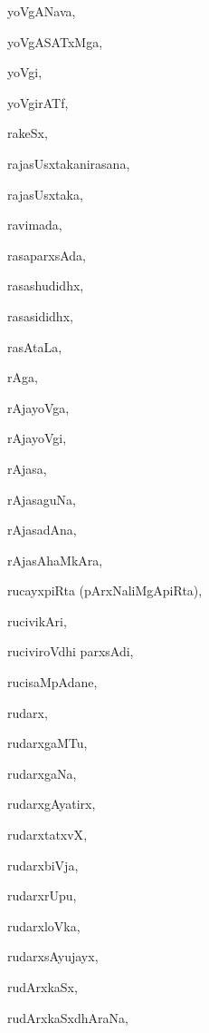 \begin{multicols}{2}
{yoVgANava}, \pageref{yoVgANava}

{yoVgASATxMga}, \pageref{yoVgASATxMga}

{yoVgi}, \pageref{yoVgi}

{yoVgirATf}, \pageref{yoVgirATf}

{rakeSx}, \pageref{rakeSx}

{rajasUsxtakanirasana}, \pageref{rajasUsxtakanirasana}

{rajasUsxtaka}, \pageref{rajasUsxtaka}

{ravimada}, \pageref{ravimada}

{rasaparxsAda}, \pageref{rasaparxsAda}

{rasashudidhx}, \pageref{rasashudidhx}

{rasasididhx}, \pageref{rasasididhx}

{rasAtaLa}, \pageref{rasAtaLa}

{rAga}, \pageref{rAga}

{rAjayoVga}, \pageref{rAjayoVga}

{rAjayoVgi}, \pageref{rAjayoVgi}

{rAjasa}, \pageref{rAjasa}

{rAjasaguNa}, \pageref{rAjasaguNa}

{rAjasadAna}, \pageref{rAjasadAna}

{rAjasAhaMkAra}, \pageref{rAjasAhaMkAra}

{rucayxpiRta (pArxNaliMgApiRta)}, \pageref{rucayxpiRta (pArxNaliMgApiRta)}

{rucivikAri}, \pageref{rucivikAri}

{ruciviroVdhi parxsAdi}, \pageref{ruciviroVdhiparxsAdi}

{rucisaMpAdane}, \pageref{rucisaMpAdane}

{rudarx}, \pageref{rudarx}

{rudarxgaMTu}, \pageref{rudarxgaMTu}

{rudarxgaNa}, \pageref{rudarxgaNa}

{rudarxgAyatirx}, \pageref{rudarxgAyatirx}

{rudarxtatxvX}, \pageref{rudarxtatxvX}

{rudarxbiVja}, \pageref{rudarxbiVja}

{rudarxrUpu}, \pageref{rudarxrUpu}

{rudarxloVka}, \pageref{rudarxloVka}

{rudarxsAyujayx}, \pageref{rudarxsAyujayx}

{rudArxkaSx}, \pageref{rudArxkaSx}

{rudArxkaSxdhAraNa}, \pageref{rudArxkaSxdhAraNa}


\end{multicols}
